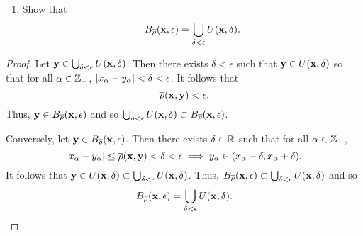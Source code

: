 \begin{solution}
  \begin{enumerate}[label={(\alph*)}, align=left, leftmargin=\parindent, listparindent=\parindent, labelwidth=0pt, itemindent=!]
    \addtocounter{enumi}{2} 
    \item Show that
      \begin{equation*}
        B_{\overline{\rho}}(\mathbf{x}, \epsilon) = \bigcup_{\delta < \epsilon} U(\mathbf{x}, \delta).
      \end{equation*}
  \end{enumerate}
  \begin{proof}
    Let $\mathbf{y} \in \bigcup_{\delta < \epsilon} U(\mathbf{x}, \delta)$.
    Then there exists $\delta < \epsilon$ such that $\mathbf{y} \in U(\mathbf{x}, \delta)$ so that for all $\alpha \in \mathbb{Z}_+$, $\left| x_\alpha - y_\alpha \right| < \delta < \epsilon$.
    It follows that
    \begin{equation*}
      \overline{\rho}(\mathbf{x}, \mathbf{y}) < \epsilon.
    \end{equation*}
    Thus, $\mathbf{y} \in B_{\overline{\rho}}(\mathbf{x}, \epsilon)$ and so $\bigcup_{\delta < \epsilon} U(\mathbf{x}, \delta) \subset B_{\overline{\rho}}(\mathbf{x}, \epsilon)$.

    Conversely, let $\mathbf{y} \in B_{\overline{\rho}}(\mathbf{x}, \epsilon)$.
    Then there exists $\delta \in \mathbb{R}$ such that for all $\alpha \in \mathbb{Z}_+$,
    \begin{equation*}
      \left| x_\alpha - y_\alpha \right| \leq \overline{\rho}(\mathbf{x}, \mathbf{y}) < \delta < \epsilon \implies y_\alpha \in (x_\alpha - \delta, x_\alpha + \delta).
    \end{equation*}
    It follows that $\mathbf{y} \in U(\mathbf{x}, \delta) \subset \bigcup_{\delta < \epsilon} U(\mathbf{x}, \delta)$.
    Thus, $B_{\overline{\rho}}(\mathbf{x}, \epsilon) \subset \bigcup_{\delta < \epsilon} U(\mathbf{x}, \delta)$ and so
    \begin{equation*}
      B_{\overline{\rho}}(\mathbf{x}, \epsilon) = \bigcup_{\delta < \epsilon} U(\mathbf{x}, \delta).
    \end{equation*}
  \end{proof}
\end{solution}
\newpage

